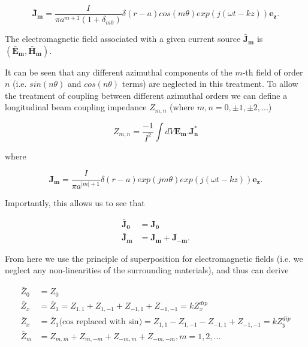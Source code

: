 \documentclass[review, number, sort&compress]{elsarticle}
\begin{document}
\begin{equation}
\mathbf{\bar{J}_{m}} = \frac{I}{\pi a^{m +1} \left( 1 + \delta_{m0} \right)} \delta \left( r - a \right) cos \left( m \theta \right) exp \left( j \left( \omega t - k z  \right) \right) \mathbf{e_{z}}.
\end{equation}

The electromagnetic field associated with a given current source $\mathbf{\bar{J}_{m}}$ is $\left( \mathbf{\bar{E}_{m}}, \mathbf{\bar{H}_{m}} \right)$. 

It can be seen that any different azimuthal components of the $m$-th field of order $n$ (i.e. $sin \left( n\theta \right)$ and $cos \left( n\theta \right)$ terms) are neglected in this treatment. To allow the treatment of coupling between different azimuthal orders we can define a longitudinal beam coupling impedance $Z_{m,n}$ (where $m,n = 0, \pm 1, \pm 2, ... $)

\begin{equation}
Z_{m,n} = \frac{-1}{I^{2}} \int dV \mathbf{E_{m}. J_{n}^{*}}
\end{equation}

where

\begin{equation}
\mathbf{J_{m}} = \frac{I}{\pi a^{|m |+1}} \delta \left( r - a \right) exp \left(j m \theta \right) exp \left( j \left( \omega t - k z  \right) \right) \mathbf{e_{z}}.
\end{equation}

Importantly, this allows us to see that 

\begin{align}
\mathbf{\bar{J}_{0}} &= \mathbf{J_{0}} \nonumber \\
\mathbf{\bar{J}_{m}} &= \mathbf{J_{m}} + \mathbf{J_{-m}}.
\end{align}

From here we use the principle of superposition for electromagnetic fields (i.e. we neglect any non-linearities of the surrounding materials), and thus can derive

\begin{align}
\bar{Z}_{0} &= Z_{0} \\
\bar{Z}_{x} &= \bar{Z}_{1} = Z_{1,1} + Z_{1,-1} + Z_{-1,1} + Z_{-1,-1} = kZ^{dip}_{x}\\
\bar{Z}_{x} &= \bar{Z}_{1} \text{(cos replaced with sin)}= Z_{1,1} - Z_{1,-1} - Z_{-1,1} + Z_{-1,-1} = kZ^{dip}_{y}\\
\bar{Z}_{m} &= Z_{m,m} + Z_{m,-m} + Z_{-m,m} + Z_{-m,-m}, m=1,2,...
\end{align}
\end{document}

